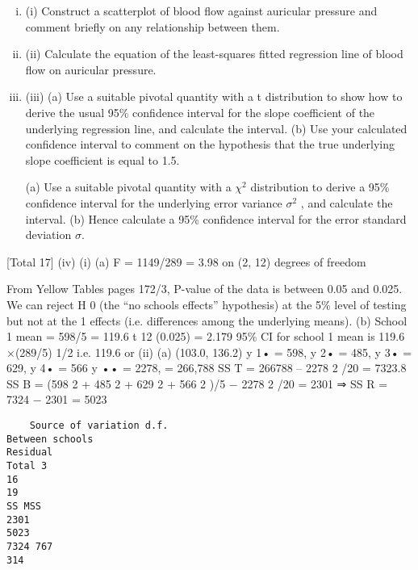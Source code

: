\documentclass[a4paper,12pt]{article}
\begin{document}
\begin{enumerate}
\begin{enumerate}[(i)]
\item (i) Construct a scatterplot of blood flow against auricular pressure and comment briefly on any relationship between them.

\item (ii) Calculate the equation of the least-squares fitted regression line of blood flow on auricular pressure.

\item (iii) (a) Use a suitable pivotal quantity with a t distribution to show how to derive the usual 95\% confidence interval for the slope coefficient of the underlying regression line, and calculate the interval.
(b) Use your calculated confidence interval to comment on the hypothesis
that the true underlying slope coefficient is equal to 1.5.

(a) Use a suitable pivotal quantity with a $\chi^2$ distribution to derive a 95\% confidence interval for the underlying error variance $\sigma^2$ , and calculate the interval.
(b) Hence calculate a 95\% confidence interval for the error standard deviation $\sigma$.
\end{enumerate}
[Total 17]
(iv)
(i)
(a)
F = 1149/289 = 3.98 on (2, 12) degrees of freedom

From Yellow Tables pages 172/3, P-value of the data is between 0.05 and 0.025.
We can reject H 0 (the “no schools effects” hypothesis) at the 5\% level of testing but not at the 1%
effects (i.e. differences among the underlying means).
(b)
School 1 mean = 598/5 = 119.6
t 12 (0.025) = 2.179
95\% CI for school 1 mean is 119.6 ×(289/5) 1/2
i.e. 119.6  or
(ii)
(a)
(103.0, 136.2)
y 1• = 598, y 2• = 485, y 3• = 629, y 4• = 566
y •• = 2278, = 266,788
SS T = 266788 – 2278 2 /20 = 7323.8
SS B = (598 2 + 485 2 + 629 2 + 566 2 )/5 − 2278 2 /20 = 2301
⇒ SS R = 7324 − 2301 = 5023

\begin{verbatim}
    Source of variation d.f.
Between schools
Residual
Total 3
16
19
SS MSS
2301
5023
7324 767
314
\end{verbatim}


\end{enumerate}
\end{document}
